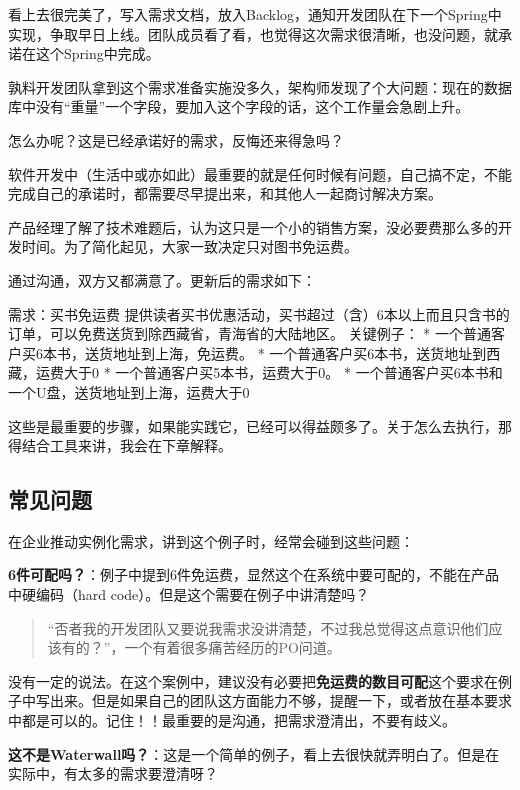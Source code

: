 看上去很完美了，写入需求文档，放入Backlog，通知开发团队在下一个Spring中实现，争取早日上线。团队成员看了看，也觉得这次需求很清晰，也没问题，就承诺在这个Spring中完成。

孰料开发团队拿到这个需求准备实施没多久，架构师发现了个大问题：现在的数据库中没有“重量”一个字段，要加入这个字段的话，这个工作量会急剧上升。

怎么办呢？这是已经承诺好的需求，反悔还来得急吗？

软件开发中（生活中或亦如此）最重要的就是任何时候有问题，自己搞不定，不能完成自己的承诺时，都需要尽早提出来，和其他人一起商讨解决方案。

产品经理了解了技术难题后，认为这只是一个小的销售方案，没必要费那么多的开发时间。为了简化起见，大家一致决定只对图书免运费。

通过沟通，双方又都满意了。更新后的需求如下：

需求：买书免运费
 提供读者买书优惠活动，买书超过（含）6本以上而且只含书的订单，可以免费送货到除西藏省，青海省的大陆地区。
 关键例子：
 * 一个普通客户买6本书，送货地址到上海，免运费。
 * 一个普通客户买6本书，送货地址到西藏，运费大于0
 * 一个普通客户买5本书，运费大于0。
 * 一个普通客户买6本书和一个U盘，送货地址到上海，运费大于0

这些是最重要的步骤，如果能实践它，已经可以得益颇多了。关于怎么去执行，那得结合工具来讲，我会在下章解释。

\subsection{常见问题}
\label{常见问题}

在企业推动实例化需求，讲到这个例子时，经常会碰到这些问题：

\textbf{6件可配吗？}：例子中提到6件免运费，显然这个在系统中要可配的，不能在产品中硬编码（hard code）。但是这个需要在例子中讲清楚吗？

\begin{quote}

“否者我的开发团队又要说我需求没讲清楚，不过我总觉得这点意识他们应该有的？”，一个有着很多痛苦经历的PO问道。
\end{quote}

没有一定的说法。在这个案例中，建议没有必要把\textbf{免运费的数目可配}这个要求在例子中写出来。但是如果自己的团队这方面能力不够，提醒一下，或者放在基本要求中都是可以的。记住！！最重要的是沟通，把需求澄清出，不要有歧义。

\textbf{这不是Waterwall吗？}：这是一个简单的例子，看上去很快就弄明白了。但是在实际中，有太多的需求要澄清呀？


